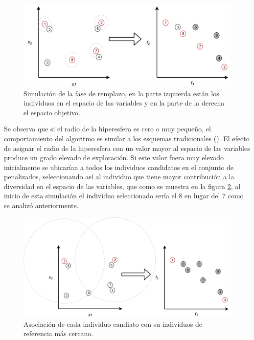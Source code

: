 \begin{figure}[H]
\centering
\scriptsize
\includegraphics[scale=0.2]
{Figures_Chapter3/Fase_Remplazo_3.png}
\decoRule
\caption{Simulación de la fase de remplazo, en la parte izquierda están los individuos en el espacio de las variables y en la parte de la derecha el espacio objetivo.}
\label{fig:Simulacion_3}
\end{figure}
%
Se observa que si el radio de la hiperesfera es cero o muy pequeño, el comportamiento del algoritmo es similar a los esquemas tradicionales (\cite{Joel:NSGAII}).
%
El efecto de asignar el radio de la hiperesfera con un valor mayor al espacio de las variables produce un grado elevado de exploración.
%
Si este valor fuera muy elevado inicialmente se ubicarían a todos los individuos candidatos en el conjunto de penalizados, seleccionando así al individuo que tiene mayor contribución a la diversidad en el espacio de las variables, que como se muestra en la figura \ref{fig:Simulacion_Penalizados}, al inicio de esta simulación el individuo seleccionado sería el $8$ en lugar del $7$ como se analizó anteriormente.
\begin{figure}[H]
\centering
\scriptsize
\includegraphics[scale=0.2]
{Figures_Chapter3/Fase_Remplazo_Penalizados.png}
\decoRule
\caption{Asociación de cada individuo candiato con su individuos de referencia más cercano.}
\label{fig:Simulacion_Penalizados}
\end{figure}

